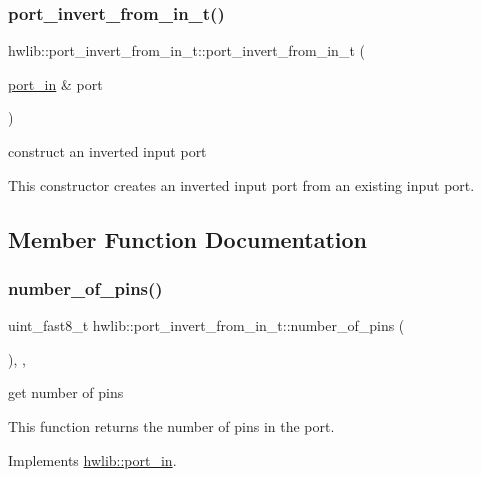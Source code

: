 \subsubsection{\texorpdfstring{port\+\_\+invert\+\_\+from\+\_\+in\+\_\+t()}{port\_invert\_from\_in\_t()}}
{\footnotesize\ttfamily hwlib\+::port\+\_\+invert\+\_\+from\+\_\+in\+\_\+t\+::port\+\_\+invert\+\_\+from\+\_\+in\+\_\+t (\begin{DoxyParamCaption}\item[{\hyperlink{classhwlib_1_1port__in}{port\+\_\+in} \&}]{port }\end{DoxyParamCaption})\hspace{0.3cm}{\ttfamily [inline]}}

construct an inverted input port

This constructor creates an inverted input port from an existing input port. 

\subsection{Member Function Documentation}
\mbox{\label{classhwlib_1_1port__invert__from__in__t_ac0b3edd19cf6da6b9d0db8b246e47778}} 
\subsubsection{\texorpdfstring{number\+\_\+of\+\_\+pins()}{number\_of\_pins()}}
{\footnotesize\ttfamily uint\+\_\+fast8\+\_\+t hwlib\+::port\+\_\+invert\+\_\+from\+\_\+in\+\_\+t\+::number\+\_\+of\+\_\+pins (\begin{DoxyParamCaption}{ }\end{DoxyParamCaption})\hspace{0.3cm}{\ttfamily [inline]}, {\ttfamily [override]}, {\ttfamily [virtual]}}





get number of pins

This function returns the number of pins in the port. 

Implements \hyperlink{classhwlib_1_1port__in_a3498fc0158e1e460a00d671df629fe22}{hwlib\+::port\+\_\+in}.

